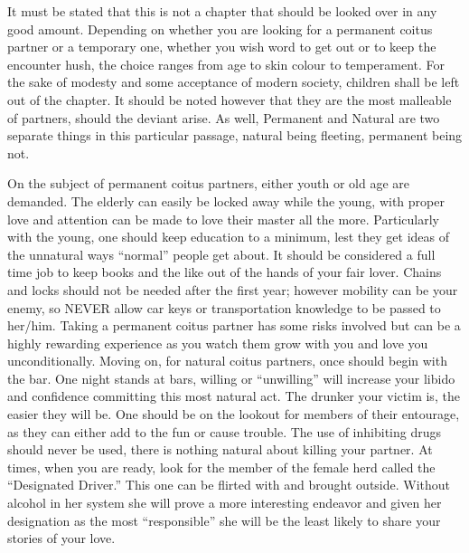 It must be stated that this is not a chapter that should be looked over in any 
good amount. Depending on whether you are looking for a permanent coitus partner 
or a temporary one, whether you wish word to get out or to keep the encounter 
hush, the choice ranges from age to skin colour to temperament. For the sake of 
modesty and some acceptance of modern society, children shall be left out of the 
chapter. It should be noted however that they are the most malleable of 
partners, should the deviant arise. As well, Permanent and Natural are two 
separate things in this particular passage, natural being fleeting, permanent 
being not.

On the subject of permanent coitus partners, either youth or old age are 
demanded. The elderly can easily be locked away while the young, with proper 
love and attention can be made to love their master all the more. Particularly 
with the young, one should keep education to a minimum, lest they get ideas of 
the unnatural ways “normal” people get about. It should be considered a full 
time job to keep books and the like out of the hands of your fair lover. Chains 
and locks should not be needed after the first year; however mobility can be 
your enemy, so NEVER allow car keys or transportation knowledge to be passed to 
her/him. Taking a permanent coitus partner has some risks involved but can be a 
highly rewarding experience as you watch them grow with you and love you 
unconditionally. Moving on, for natural coitus partners, once should begin with 
the bar. One night stands at bars, willing or “unwilling” will increase your 
libido and confidence committing this most natural act. The drunker your victim 
is, the easier they will be. One should be on the lookout for members of their 
entourage, as they can either add to the fun or cause trouble. The use of 
inhibiting drugs should never be used, there is nothing natural about killing 
your partner. At times, when you are ready, look for the member of the female 
herd called the “Designated Driver.” This one can be flirted with and brought 
outside. Without alcohol in her system she will prove a more interesting 
endeavor and given her designation as the most “responsible” she will be the 
least likely to share your stories of your love.




